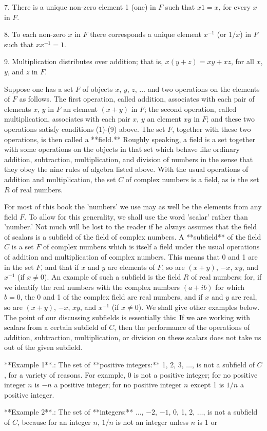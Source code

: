 7. There is a unique non-zero element 1 (one) in \(F\) such that \(x1=x\), for every \(x\) in \(F\).

8. To each non-zero \(x\) in \(F\) there corresponds a unique element \(x^{-1}\) (or \(1/x\)) in \(F\) such that \(xx^{-1}=1\).

9. Multiplication distributes over addition; that is, \(x(y+z)=xy+xz\), for all \(x\), \(y\), and \(z\) in \(F\).

Suppose one has a set \(F\) of objects \(x\), \(y\), \(z\), \(\ldots\) and two operations on the elements of \(F\) as follows. The first operation, called addition, associates with each pair of elements \(x\), \(y\) in \(F\) an element \((x+y)\) in \(F\); the second operation, called multiplication, associates with each pair \(x\), \(y\) an element \(xy\) in \(F\); and these two operations satisfy conditions (1)-(9) above. The set \(F\), together with these two operations, is then called a **field.** Roughly speaking, a field is a set together with some operations on the objects in that set which behave like ordinary addition, subtraction, multiplication, and division of numbers in the sense that they obey the nine rules of algebra listed above. With the usual operations of addition and multiplication, the set \(C\) of complex numbers is a field, as is the set \(R\) of real numbers.

For most of this book the 'numbers' we use may as well be the elements from any field \(F\). To allow for this generality, we shall use the word 'scalar' rather than 'number.' Not much will be lost to the reader if he always assumes that the field of scalars is a subfield of the field of complex numbers. A **subfield** of the field \(C\) is a set \(F\) of complex numbers which is itself a field under the usual operations of addition and multiplication of complex numbers. This means that 0 and 1 are in the set \(F\), and that if \(x\) and \(y\) are elements of \(F\), so are \((x+y)\), \(-x\), \(xy\), and \(x^{-1}\) (if \(x\neq 0\)). An example of such a subfield is the field \(R\) of real numbers; for, if we identify the real numbers with the complex numbers \((a+ib)\) for which \(b=0\), the 0 and 1 of the complex field are real numbers, and if \(x\) and \(y\) are real, so are \((x+y)\), \(-x\), \(xy\), and \(x^{-1}\) (if \(x\neq 0\)). We shall give other examples below. The point of our discussing subfields is essentially this: If we are working with scalars from a certain subfield of \(C\), then the performance of the operations of addition, subtraction, multiplication, or division on these scalars does not take us out of the given subfield.

**Example 1**.: The set of **positive integers:** 1, 2, 3, \(\ldots\), is not a subfield of \(C\), for a variety of reasons. For example, 0 is not a positive integer; for no positive integer \(n\) is \(-n\) a positive integer; for no positive integer \(n\) except 1 is \(1/n\) a positive integer.

**Example 2**.: The set of **integers:** \(\ldots\), \(-2\), \(-1\), 0, 1, 2, \(\ldots\), is not a subfield of \(C\), because for an integer \(n\), \(1/n\) is not an integer unless \(n\) is 1 or 